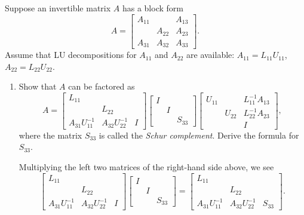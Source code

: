 \documentclass{../kin_math}
\begin{document}
\begin{questions}
  \question Suppose an invertible matrix $A$ has a block form
  \begin{equation}
    A = \begin{bmatrix} A_{11} & & A_{13} \\ & A_{22} & A_{23} \\ A_{31} & A_{32} & A_{33} \end{bmatrix}.
  \end{equation}
  Assume that LU decompositions for $A_{11}$ and $A_{22}$ are available: $A_{11} = L_{11} U_{11}$, $A_{22} = L_{22} U_{22}$.
  \begin{enumerate}
    \item Show that $A$ can be factored as
    \begin{equation}
      \label{eq:schur}
      A = \begin{bmatrix} L_{11} & & \\ & L_{22} & \\ A_{31} U_{11}^{-1} & A_{32} U_{22}^{-1} & I \end{bmatrix} \begin{bmatrix} I & & \\ & I & \\ & & S_{33} \end{bmatrix} \begin{bmatrix} U_{11} & & L_{11}^{-1} A_{13} \\ & U_{22} & L_{22}^{-1} A_{23} \\ & & I \end{bmatrix},
    \end{equation}
    where the matrix $S_{33}$ is called the \emph{Schur complement}. Derive the formula for $S_{33}$.
    \begin{solution}
      Multiplying the left two matrices of the right-hand side above, we see
      \begin{equation*}
        \begin{bmatrix} L_{11} & & \\ & L_{22} & \\ A_{31} U_{11}^{-1} & A_{32} U_{22}^{-1} & I \end{bmatrix} \begin{bmatrix} I & & \\ & I & \\ & & S_{33} \end{bmatrix} = \begin{bmatrix} L_{11} & & \\ & L_{22} & \\ A_{31} U_{11}^{-1} & A_{32} U_{22}^{-1} & S_{33} \end{bmatrix}.

\end{equation*}
\end{solution}
\end{enumerate}
\end{questions}
\end{document}
